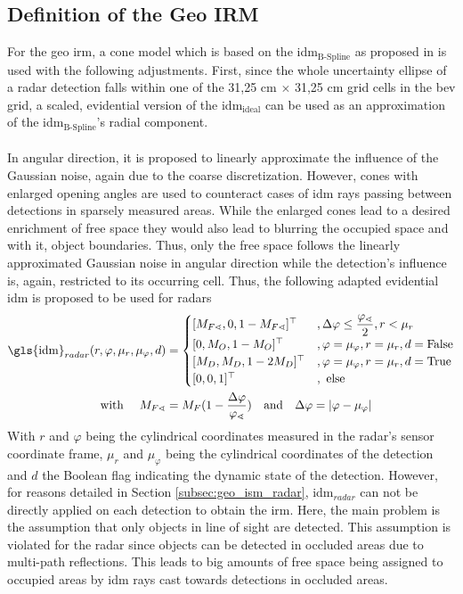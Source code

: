 %
\subsection{Definition of the Geo IRM}
\label{subsec:method_geo_irm}
For the geo \gls{irm}, a cone model which is based on the \gls{idm}$_{\text{B-Spline}}$ as proposed in \cite{loop2016closed} is used with the following adjustments. First, since the whole uncertainty ellipse of a radar detection falls within one of the 31,25 cm $\times$ 31,25 cm grid cells in the \gls{bev} grid, a scaled, evidential version of the \gls{idm}$_{\text{ideal}}$ can be used as an approximation of the \gls{idm}$_{\text{B-Spline}}$'s radial component.
\\\\
In angular direction, it is proposed to linearly approximate the influence of the Gaussian noise, again due to the coarse discretization. However, cones with enlarged opening angles are used to counteract cases of \gls{idm} rays passing between detections in sparsely measured areas. While the enlarged cones lead to a desired enrichment of free space they would also lead to blurring the occupied space and with it, object boundaries. Thus, only the free space follows the linearly approximated Gaussian noise in angular direction while the detection's influence is, again, restricted to its occurring cell. Thus, the following adapted evidential \gls{idm} is proposed to be used for radars
\begin{align}
	\label{eq:idm_radar}
	\text{\gls{idm}}_{radar}(r, \varphi, \mu_r, \mu_\varphi, d) &= 
	\begin{cases}
		[M_{F\sphericalangle},0,1-M_{F\sphericalangle}]^\top &, \Delta\varphi \leq \dfrac{\varphi_\sphericalangle}{2}, r < \mu_r\\
		[0,M_O,1-M_O]^\top &, \varphi = \mu_{\varphi}, r = \mu_r, d = \text{False}\\
		[M_D,M_D,1-2M_D]^\top &, \varphi = \mu_{\varphi}, r = \mu_r, d = \text{True}\\		
		[0,0,1]^\top &, \text{ else}\\
	\end{cases}\\
	\text{with } \quad M_{F\sphericalangle} &= M_F(1 - \dfrac{\Delta\varphi}{\varphi_\sphericalangle}) \quad\text{and}\quad \Delta\varphi = |\varphi - \mu_\varphi|\\
\end{align}
With $r$ and $\varphi$ being the cylindrical coordinates measured in the radar's sensor coordinate frame, $\mu_r$ and $\mu_{\varphi}$ being the cylindrical  coordinates of the detection and $d$ the Boolean flag indicating the dynamic state of the detection. However, for reasons detailed in Section \ref{subsec:geo_ism_radar}, \gls{idm}$_{radar}$ can not be directly applied on each detection to obtain the \gls{irm}. Here, the main problem is the assumption that only objects in line of sight are detected. This assumption is violated for the radar since objects can be detected in occluded areas due to multi-path reflections. This leads to big amounts of free space being assigned to occupied areas by \gls{idm} rays cast towards detections in occluded areas. 
